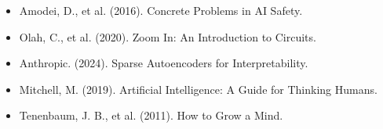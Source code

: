 \documentclass[11pt]{article}
\begin{document}
\begin{itemize}
  \item Amodei, D., et al. (2016). Concrete Problems in AI Safety.
  \item Olah, C., et al. (2020). Zoom In: An Introduction to Circuits.
  \item Anthropic. (2024). Sparse Autoencoders for Interpretability.
  \item Mitchell, M. (2019). Artificial Intelligence: A Guide for Thinking Humans.
  \item Tenenbaum, J. B., et al. (2011). How to Grow a Mind.
\end{itemize}
\end{document}
